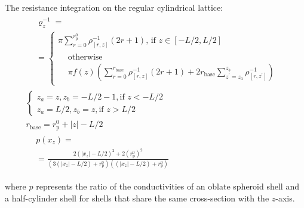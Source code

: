 \documentclass[10pt, a4paper]{article}
\begin{document}
\begin{multicols}{2}
The resistance integration on the regular cylindrical lattice:
\begin{gather}
    \label{eq:r_z_num}
    \begin{aligned} 
        &\varrho_{z}^{-1} =
        \\
        &=\begin{cases}
             \pi \sum_{r=0}^{r_{\text{p}}^{0}} \rho^{-1}_{[r,z]} (2r+1) \text{, if } z\in[-L/2,L/2]
             \\[4pt]
             \begin{aligned}
                &\text{otherwise}
                \\
                &\pi f(z) \left(\sum_{r=0}^{r_{\text{base}}} \rho^{-1}_{[r,z]} (2r+1) + 2 r_{\text{base}} \sum_{z^{\prime} = z_{a}}^{z_{b}}\rho^{-1}_{[r,z^{\prime}]}\right)
             \end{aligned}
        \end{cases}
    \end{aligned}
    \\
    \begin{cases}
        z_{a} = z, z_{b} = -L/2-1, \text{if } z < -L/2
        \\
        z_{a} = L/2, z_{b} = z, \text{if } z > L/2
    \end{cases}
    \\
    \label{eq:r_base}
    r_{\text{base}} = r_{\text{p}}^{0} + |z| - L/2
    \\
    \label{eq:prefactor}
    \begin{aligned}
        &p(x_z) =\\
        & = \frac{2(|x_z|-L/2)^2 + 2(r_{\text{p}}^{0})^2}{(3(|x_z|-L/2)+r_{\text{p}}^{0})((|x_z|-L/2)+r_{\text{p}}^{0})}
    \end{aligned}
\end{gather}

where $p$ represents the ratio of the conductivities of an oblate spheroid shell and a half-cylinder shell for shells that share the same cross-section with the $z$-axis.


\end{multicols}
\end{document}

